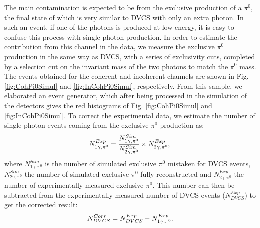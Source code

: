 \documentclass[aps,prc,preprint,superscriptaddress]{revtex4}
\begin{document}
The main contamination is expected to be 
from the exclusive production of a $\pi^0$, the final state of which is very similar to DVCS with 
only an extra photon. In such an event, if one of the photons is produced at low energy, it is 
easy to confuse this process with single photon production. In order to estimate the contribution from
this channel in the data, we measure the exclusive $\pi^0$ production in the same way as DVCS, with 
a series of exclusivity cuts, completed by a selection cut on the invariant mass of the two photons
to match the $\pi^0$ mass. The events obtained for the coherent and incoherent
channels are shown in Fig. \ref{fig:CohPi0Simul} and \ref{fig:InCohPi0Simul}, respectively. From 
this sample, we elaborated an event generator, which after being processed
in the simulation of the detectors gives the red histograms of Fig. \ref{fig:CohPi0Simul} and 
\ref{fig:InCohPi0Simul}. To correct the experimental data, we estimate the number of single photon 
events coming from the exclusive $\pi^0$ production as:
\begin{equation}
	N_{1\gamma,\pi^0}^{Exp} = \frac{N_{1\gamma,\pi^0}^{Sim}}{N_{2\gamma,\pi^0}^{Sim}} \times N_{2\gamma,\pi^0}^{Exp},\\
\end{equation}
where $N_{1\gamma,\pi^0}^{Sim}$ is the number of simulated exclusive $\pi^0$ mistaken for DVCS events,
$N_{2\gamma,\pi^0}^{Sim}$ the number of simulated exclusive $\pi^0$ fully reconstructed and $N_{2\gamma,\pi^0}^{Exp}$
the number of experimentally measured exclusive $\pi^0$. This number can then be subtracted from
the experimentally measured number of DVCS events ($N_{DVCS}^{Exp}$) to get the corrected result: 
\begin{equation}
	N_{DVCS}^{Corr} = N_{DVCS}^{Exp} - N_{1\gamma,\pi^0}^{Exp}.\\
\end{equation}
\end{document}

